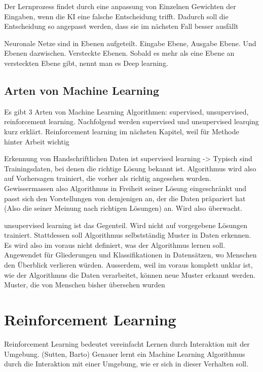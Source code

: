 Der Lernprozess findet durch eine anpassung von Einzelnen Gewichten der
Eingaben, wenn die KI eine falsche Entscheidung trifft. Dadurch soll die
Entscheidung so angepasst werden, dass sie im nächsten Fall besser ausfällt

Neuronale Netze sind in Ebenen aufgeteilt. Eingabe Ebene, Ausgabe Ebene. Und
Ebenen dazwischen. Versteckte Ebenen. Sobald es mehr als eine Ebene an
versteckten Ebene gibt, nennt man es Deep learning.

\subsection*{Arten von Machine Learning}

Es gibt 3 Arten von Machine Learning Algorithmen: supervised, unsupervised,
reinforcement learning. Nachfolgend werden supervised und unsupervised learqing
kurz erklärt. Reinforcement learning im nächsten Kapitel, weil für Methode
hinter Arbeit wichtig

Erkennung von Handschriftlichen Daten ist supervised learning -> Typisch sind
Trainingsdaten, bei denen die richtige Lösung bekannt ist. Algorithmus wird also
auf Vorhersagen trainiert, die vorher als richtig angesehen wurden.
Gewissermassen also Algorithmus in Freiheit seiner Lösung eingeschränkt und
passt sich den Vorstellungen von demjenigen an, der die Daten präpariert hat
(Also die seiner Meinung nach richtigen Lösungen) an. Wird also überwacht.

unsupervised learning ist das Gegenteil. Wird nicht auf vorgegebene Lösungen
trainiert. Stattdessen soll Algorithmus selbstständig Muster in Daten erkennen.
Es wird also im voraus nicht definiert, was der Algorithmus lernen soll.
Angewendet für Gliederungen und Klassifikationen in Datensätzen, wo Menschen den
Überblick verlieren würden. Ausserdem, weil im voraus komplett unklar ist, wie
der Algorithmus die Daten verarbeitet, können neue Muster erkannt werden.
Muster, die von Menschen bisher übersehen wurden 


\section{Reinforcement Learning}
\label{chap:t_rl}

Reinforcement Learning bedeutet vereinfacht Lernen durch Interaktion mit der
Umgebung. (Sutten, Barto)  Genauer lernt ein Machine Learning Algorithmus durch
die Interaktion mit einer Umgebung, wie er sich in dieser Verhalten soll.

